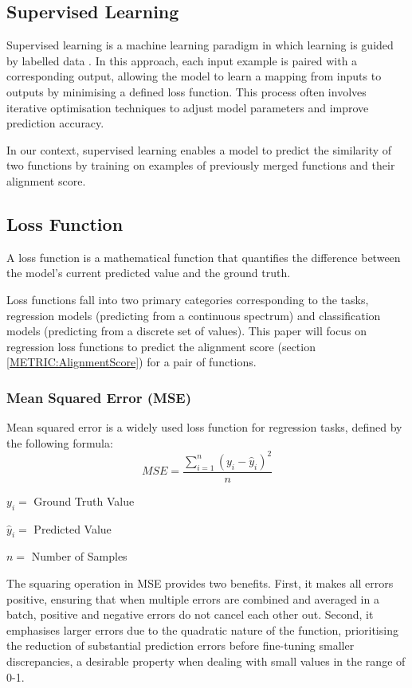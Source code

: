 \subsection{Supervised Learning}
Supervised learning is a machine learning paradigm in which learning is guided by labelled data \cite{MLParadigms} \cite{SupervisedLearningAndTrainingProcess}. In this approach, each input example is paired with a corresponding output, allowing the model to learn a mapping from inputs to outputs by minimising a defined loss function. This process often involves iterative optimisation techniques to adjust model parameters and improve prediction accuracy. 

In our context, supervised learning enables a model to predict the similarity of two functions by training on examples of previously merged functions and their alignment score.

\subsection{Loss Function} \label{ML:LossFunction}
A loss function is a mathematical function that quantifies the difference between the model's current predicted value and the ground truth.

Loss functions fall into two primary categories corresponding to the tasks, regression models (predicting from a continuous spectrum) and classification models (predicting from a discrete set of values). This paper will focus on regression loss functions to predict the alignment score (section \ref{METRIC:AlignmentScore}) for a pair of functions.

\subsubsection{Mean Squared Error (MSE)}
Mean squared error is a widely used loss function for regression tasks, defined by the following formula: 
$$MSE=\frac{\sum^n_{i=1}(y_i-\hat{y}_i)^2}{n}$$

\hspace{1cm} $y_i = $ Ground Truth Value

\hspace{1cm} $\hat{y}_i = $ Predicted Value

\hspace{1cm} $n = $ Number of Samples

The squaring operation in MSE provides two benefits. First, it makes all errors positive, ensuring that when multiple errors are combined and averaged in a batch, positive and negative errors do not cancel each other out. Second, it emphasises larger errors due to the quadratic nature of the function, prioritising the reduction of substantial prediction errors before fine-tuning smaller discrepancies, a desirable property when dealing with small values in the range of 0-1.


